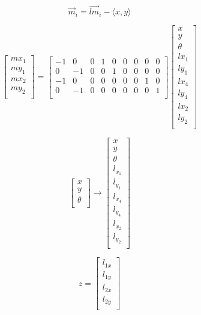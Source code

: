 \documentclass[11pt]{report}
\begin{document}
$$
\vec{m}_i = \vec{lm}_i - \langle x, y \rangle
$$

$$
\begin{bmatrix}
    mx_1 \\
    my_1 \\
    mx_2 \\
    my_2 \\
\end{bmatrix}
=
\begin{bmatrix}
    -1 & 0 & 0 & 1 & 0 & 0 & 0 & 0 & 0 \\
    0 & -1 & 0 & 0 & 1 & 0 & 0 & 0 & 0 \\
    -1 & 0 & 0 & 0 & 0 & 0 & 0 & 1 & 0 \\
    0 & -1 & 0 & 0 & 0 & 0 & 0 & 0 & 1 \\
\end{bmatrix}
\begin{bmatrix}
    x \\
    y \\
    \theta \\
    lx_1 \\
    ly_1 \\
    lx_4 \\
    ly_4 \\
    lx_2 \\
    ly_2 \\
\end{bmatrix}
$$


$$
\begin{bmatrix}
    x \\
    y \\
    \theta \\
\end{bmatrix}
\rightarrow
\begin{bmatrix}
    x \\
    y \\
    \theta \\
    l_{x_1} \\
    l_{y_1} \\
    l_{x_4} \\
    l_{y_4} \\
    l_{x_2} \\
    l_{y_2} \\
\end{bmatrix}
$$

$$
z = 
\begin{bmatrix}
    l_{1x} \\
    l_{1y} \\
    l_{2x} \\
    l_{2y} \\
\end{bmatrix}
$$
\end{document}
